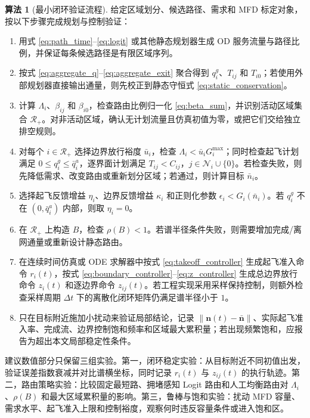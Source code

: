 \documentclass[a4paper,12pt]{article}
\theoremstyle{plain}
\theoremstyle{definition}
\newtheorem{algorithm}[theorem]{算法}
\theoremstyle{remark}
\begin{document}
\begin{algorithm}[最小闭环验证流程]\label{alg:verify}
给定区域划分、候选路径、需求和 MFD 标定对象，按以下步骤完成规划与控制验证：
\begin{enumerate}
    \item 用式 \eqref{eq:path_time}--\eqref{eq:logit} 或其他静态规划器生成 OD 服务流量与路径比例，并保证每条候选路径是有限区域序列。
    \item 按式 \eqref{eq:aggregate_q}--\eqref{eq:aggregate_exit} 聚合得到 $q_i^g$、$T_{ij}$ 和 $T_{i0}$；若使用外部规划器直接输出通量，则先校正到静态守恒式 \eqref{eq:static_conservation}。
    \item 计算 $\Lambda_i$、$\beta_{ij}$ 和 $\beta_{i0}$，检查路由比例归一化 \eqref{eq:beta_sum}，并识别活动区域集合 $\mathcal R_+$。对非活动区域，确认无计划流量且仿真初值为零，或把它们交给独立排空规则。
    \item 对每个 $i\in\mathcal R_+$ 选择边界放行裕度 $\bar u_i$，检查 $\Lambda_i<\bar u_iG_i^{\max}$；同时检查起飞计划满足 $0\le q_i^g\le \bar q_i^a$，逐界面计划满足 $T_{ij}<C_{ij}$，$j\in\mathcal N_i\cup\{0\}$。若检查失败，则先降低需求、改变路由或重新划分区域；若通过，则计算目标 $\bar n_i$。
    \item 选择起飞反馈增益 $\eta_i$、边界反馈增益 $\kappa_i$ 和正则化参数 $\epsilon_i<G_i(\bar n_i)$。若 $q_i^g$ 不在 $(0,\bar q_i^a)$ 内部，则取 $\eta_i=0$。
    \item 在 $\mathcal R_+$ 上构造 $B$，检查 $\rho(B)<1$。若谱半径条件失败，则需要增加完成/离网通量或重新设计静态路由。
    \item 在连续时间仿真或 ODE 求解器中按式 \eqref{eq:takeoff_controller} 生成起飞准入命令 $r_i(t)$，按式 \eqref{eq:boundary_controller}--\eqref{eq:z_controller} 生成总边界放行命令 $z_i(t)$ 和逐边界命令 $z_{ij}(t)$。若工程实现采用采样保持控制，则额外检查采样周期 $\Delta t$ 下的离散化闭环矩阵仍满足谱半径小于 $1$。
    \item 只在目标附近施加小扰动来验证局部结论，记录 $\|\bm n(t)-\bar{\bm n}\|$、实际起飞准入率、完成流、边界控制饱和频率和区域最大累积量；若出现频繁饱和，应报告为超出本文局部稳定性条件。
\end{enumerate}
\end{algorithm}

建议数值部分只保留三组实验。第一，闭环稳定实验：从目标附近不同初值出发，验证误差指数衰减并对比谱横坐标，同时记录 $r_i(t)$ 与 $z_{ij}(t)$ 的执行轨迹。第二，路由策略实验：比较固定最短路、拥堵感知 Logit 路由和人工均衡路由对 $\Lambda_i$、$\rho(B)$ 和最大区域累积量的影响。第三，鲁棒与饱和实验：扰动 MFD 容量、需求水平、起飞准入上限和控制裕度，观察何时违反容量条件或进入饱和区。
\end{document}
